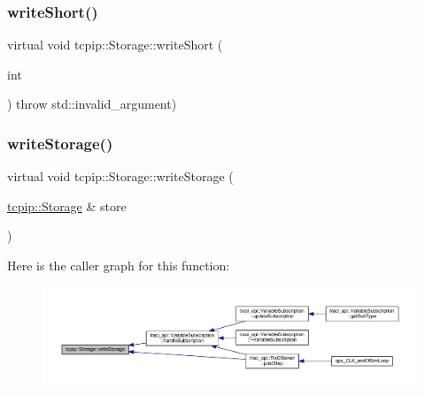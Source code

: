 \mbox{\label{classtcpip_1_1_storage_ae7af58d12716f7119877efb7919813f4}} 
\subsubsection{\texorpdfstring{write\+Short()}{writeShort()}}
{\footnotesize\ttfamily virtual void tcpip\+::\+Storage\+::write\+Short (\begin{DoxyParamCaption}\item[{int}]{ }\end{DoxyParamCaption}) throw  std\+::invalid\+\_\+argument) \hspace{0.3cm}{\ttfamily [virtual]}}

\mbox{\label{classtcpip_1_1_storage_af574cbcecfb20c5525d579cd4a0bac8f}} 
\subsubsection{\texorpdfstring{write\+Storage()}{writeStorage()}}
{\footnotesize\ttfamily virtual void tcpip\+::\+Storage\+::write\+Storage (\begin{DoxyParamCaption}\item[{\hyperlink{classtcpip_1_1_storage}{tcpip\+::\+Storage} \&}]{store }\end{DoxyParamCaption})\hspace{0.3cm}{\ttfamily [virtual]}}

Here is the caller graph for this function\+:\nopagebreak
\begin{figure}[H]
\begin{center}
\leavevmode
\includegraphics[width=350pt]{classtcpip_1_1_storage_af574cbcecfb20c5525d579cd4a0bac8f_icgraph}
\end{center}
\end{figure}
\mbox{\label{classtcpip_1_1_storage_a07b6d4f8db8f1893aa4ed419be5a5d25}} 
